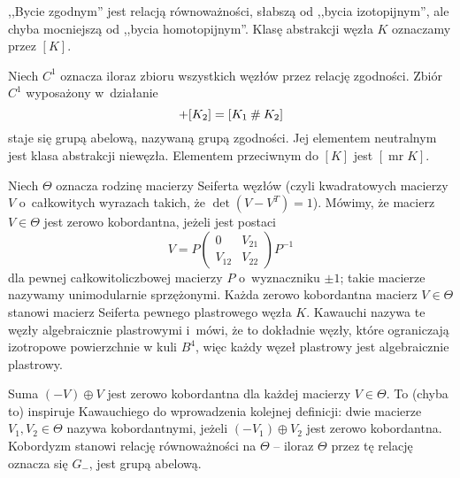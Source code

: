,,Bycie zgodnym'' jest relacją równoważności, słabszą od ,,bycia izotopijnym'', ale chyba mocniejszą od ,,bycia homotopijnym''.
Klasę abstrakcji węzła $K$ oznaczamy przez $[K]$.

\begin{definition}
%
    Niech $C^1$ oznacza iloraz zbioru wszystkich węzłów przez relację zgodności.
    Zbiór $C^1$ wyposażony w~działanie
    \begin{equation}
        [K_1] + [K_2] = [K_1 \shrap K_2]
    \end{equation}
    staje się grupą abelową, nazywaną grupą zgodności.
    Jej elementem neutralnym jest klasa abstrakcji niewęzła.
    Elementem przeciwnym do $[K]$ jest $[\operatorname{mr} K]$.
\end{definition}


Niech $\Theta$ oznacza rodzinę macierzy Seiferta węzłów (czyli kwadratowych macierzy $V$ o~całkowitych wyrazach takich, że $\det (V - V^T) = 1$).
Mówimy, że macierz $V \in \Theta$ jest zerowo kobordantna, jeżeli jest postaci
\begin{equation}
    V = P \begin{pmatrix} 0 & V_{21} \\ V_{12} & V_{22} \end{pmatrix} P^{-1}
\end{equation}
dla pewnej całkowitoliczbowej macierzy $P$ o~wyznaczniku $\pm 1$; takie macierze nazywamy unimodularnie sprzężonymi.
%
Każda zerowo kobordantna macierz $V \in \Theta$ stanowi macierz Seiferta pewnego plastrowego węzła $K$.
Kawauchi nazywa te węzły algebraicznie plastrowymi i~mówi, że to dokładnie węzły, które ograniczają izotropowe powierzchnie w kuli $B^4$, więc każdy węzeł plastrowy jest algebraicznie plastrowy.

Suma $(-V) \oplus V$ jest zerowo kobordantna dla każdej macierzy $V \in \Theta$.
To (chyba to) inspiruje Kawauchiego do wprowadzenia kolejnej definicji: dwie macierze $V_1, V_2 \in \Theta$ nazywa kobordantnymi, jeżeli $(-V_1) \oplus V_2$ jest zerowo kobordantna.
Kobordyzm stanowi relację równoważności na $\Theta$ -- iloraz $\Theta$ przez tę relację oznacza się $G_-$, jest grupą abelową.

